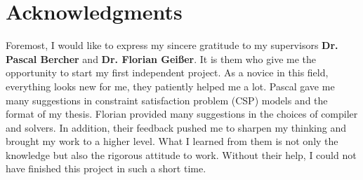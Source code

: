 \chapter*{Acknowledgments}
Foremost, I would like to express my sincere gratitude to my supervisors \textbf{Dr. Pascal Bercher} and \textbf{Dr. Florian Geißer}. It is them who give me the opportunity to start my first independent project. As a novice in this field, everything looks new for me, they patiently helped me a lot. Pascal gave me many suggestions in constraint satisfaction problem (CSP) models and the format of my thesis. Florian provided many suggestions in the choices of compiler and solvers. In addition, their feedback pushed me to sharpen my thinking and brought my work to a higher level. What I learned from them is not only the knowledge but also the rigorous attitude to work. Without their help, I could not have finished this project in such a short time.